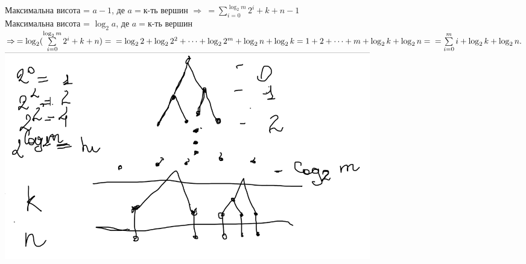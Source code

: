 \documentclass[a4paper,12pt]{article}
\begin{document}
\begin{enumerate}
			Максимальна висота = $a-1$, де $a=$к-ть вершин $\Rightarrow \>=\sum\limits_{i=0}^{\log_2m}2^i+k+n-1$\\
			Максимальна висота = $\log_2a$, де $a=$к-ть вершин $\Rightarrow\>= \log_2(\sum\limits_{i=0}^{\log_2m}2^i+k+n)=\\=\log_22+\log_22^2+\dots+\log_22^m+\log_2n+\log_2k=1+2+\dots+m+\log_2k+\log_2n=\\=\sum\limits_{i=0}^{m}i+\log_2k+\log_2n.\\$
			\includegraphics[width=16cm]{tree3.png}
\end{enumerate}
\end{document}
